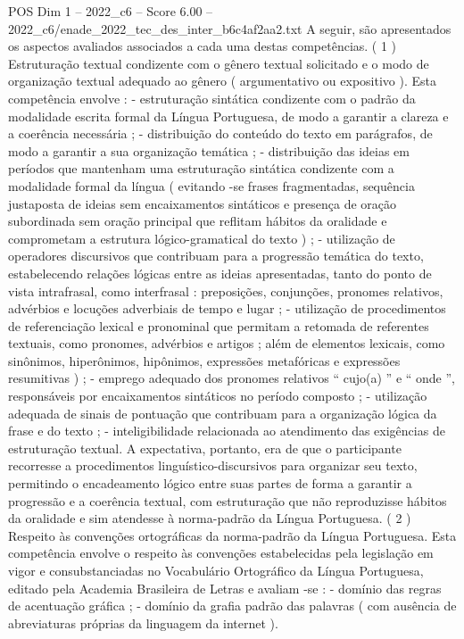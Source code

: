 \begin{textsample}{POS Dim 1 – 2022\_c6 – Score 6.00 – 2022\_c6/enade\_2022\_tec\_des\_inter\_b6c4af2aa2.txt}
A seguir, são apresentados os aspectos avaliados associados a cada uma destas competências. ( 1 ) Estruturação textual condizente com o gênero textual solicitado e o modo de organização textual adequado ao gênero ( argumentativo ou expositivo ).
Esta competência envolve : - estruturação sintática condizente com o padrão da modalidade escrita formal da Língua Portuguesa, de modo a garantir a clareza e a coerência necessária ; - distribuição do conteúdo do texto em parágrafos, de modo a garantir a sua organização temática ; - distribuição das ideias em períodos que mantenham uma estruturação sintática condizente com a modalidade formal da língua ( evitando -se frases fragmentadas, sequência justaposta de ideias sem encaixamentos sintáticos e presença de oração subordinada sem oração principal que reflitam hábitos da oralidade e comprometam a estrutura lógico-gramatical do texto ) ; - utilização de operadores discursivos que contribuam para a progressão temática do texto, estabelecendo relações lógicas entre as ideias apresentadas, tanto do ponto de vista intrafrasal, como interfrasal : preposições, conjunções, pronomes relativos, advérbios e locuções adverbiais de tempo e lugar ; - utilização de procedimentos de referenciação lexical e pronominal que permitam a retomada de referentes textuais, como pronomes, advérbios e artigos ; além de elementos lexicais, como sinônimos, hiperônimos, hipônimos, expressões metafóricas e expressões resumitivas ) ; - emprego adequado dos pronomes relativos “ cujo(a) ” e “ onde ”, responsáveis por encaixamentos sintáticos no período composto ; - utilização adequada de sinais de pontuação que contribuam para a organização lógica da frase e do texto ; - inteligibilidade relacionada ao atendimento das exigências de estruturação textual.
A expectativa, portanto, era de que o participante recorresse a procedimentos linguístico-discursivos para organizar seu texto, permitindo o encadeamento lógico entre suas partes de forma a garantir a progressão e a coerência textual, com estruturação que não reproduzisse hábitos da oralidade e sim atendesse à norma-padrão da Língua Portuguesa. ( 2 ) Respeito às convenções ortográficas da norma-padrão da Língua Portuguesa.
Esta competência envolve o respeito às convenções estabelecidas pela legislação em vigor e consubstanciadas no Vocabulário Ortográfico da Língua Portuguesa, editado pela Academia Brasileira de Letras e avaliam -se : - domínio das regras de acentuação gráfica ; - domínio da grafia padrão das palavras ( com ausência de abreviaturas próprias da linguagem da internet ).

\end{textsample}
